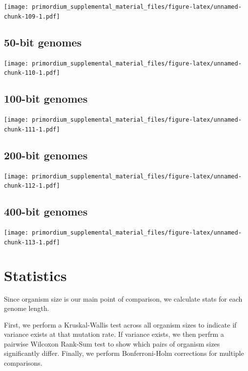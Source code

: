 \documentclass[]{book}
\begin{document}
\texttt{[image: primordium\_supplemental\_material\_files/figure-latex/unnamed-chunk-109-1.pdf]}

\hypertarget{bit-genomes-6}{%
\subsection{50-bit genomes}\label{bit-genomes-6}}

\texttt{[image: primordium\_supplemental\_material\_files/figure-latex/unnamed-chunk-110-1.pdf]}

\hypertarget{bit-genomes-7}{%
\subsection{100-bit genomes}\label{bit-genomes-7}}

\texttt{[image: primordium\_supplemental\_material\_files/figure-latex/unnamed-chunk-111-1.pdf]}

\hypertarget{bit-genomes-8}{%
\subsection{200-bit genomes}\label{bit-genomes-8}}

\texttt{[image: primordium\_supplemental\_material\_files/figure-latex/unnamed-chunk-112-1.pdf]}

\hypertarget{bit-genomes-9}{%
\subsection{400-bit genomes}\label{bit-genomes-9}}

\texttt{[image: primordium\_supplemental\_material\_files/figure-latex/unnamed-chunk-113-1.pdf]}

\hypertarget{statistics-6}{%
\section{Statistics}\label{statistics-6}}

Since organism size is our main point of comparison, we calculate stats for each genome length.

First, we perform a Kruskal-Wallis test across all organism sizes to indicate if variance exists at that mutation rate.
If variance exists, we then perfrm a pairwise Wilcoxon Rank-Sum test to show which pairs of organism sizes significantly differ.
Finally, we perform Bonferroni-Holm corrections for multiple comparisons.
\end{document}
